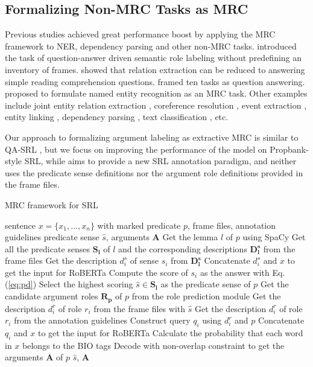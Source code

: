 \documentclass[11pt]{article}
\begin{document}
\subsection{Formalizing Non-MRC Tasks as MRC}
Previous studies achieved great performance boost by applying the MRC framework to NER, dependency parsing and other non-MRC tasks.
\citet{he2015question} introduced the task of question-answer driven semantic role labeling without predefining an inventory of frames. \citet{levy2017zero} showed that relation extraction can be reduced to answering simple reading comprehension questions. \citet{McCann2018TheNL} framed ten tasks as question answering. \citet{Li2020AUM} proposed to
formulate named entity recognition as an MRC task.  Other examples include joint entity relation extraction \cite{Li2019EntityRelationEA}, coreference resolution \cite{Wu2020CorefQACR}, event extraction \cite{Li2020EventEA},  entity linking \cite{Gu2021ReadRS}, dependency parsing \cite{gan2021dependency}, text classification \cite{chai2020description}, etc. 

Our approach to formalizing argument labeling as extractive MRC is similar to QA-SRL \cite{he2015question}, but we focus on improving the performance of the model on Propbank-style SRL, while \citet{he2015question} aims to provide a new SRL annotation paradigm, and \citet{he2015question} neither uses the predicate sense definitions nor the argument role definitions provided in the frame files.

\begin{algorithm}[!ht]
	\caption{MRC framework for SRL}
	\label{alg}
	\begin{algorithmic}[1]
        \REQUIRE sentence $x=\{x_1,...,x_n\}$ with marked predicate $p$, frame files, annotation guidelines
        \ENSURE predicate sense $\hat{s}$, arguments $\bm{A}$
        \STATE Get the lemma $l$ of $p$ using SpaCy
        \STATE Get all the predicate senses $\bm{S_l}$ of $l$ and the corresponding descriptions $\bm{D^s_l}$ from the frame files
            \STATE Get the description $d^s_i$ of sense $s_i$ from $\bm{D^s_l}$
            \STATE Concatenate $d^s_i$ and $x$ to get the input for RoBERTa
            \STATE Compute the score of $s_i$ as the answer with Eq.(\ref{eq:pd})
        \ENDFOR 
        \STATE Select the highest scoring $\hat{s}\in \bm{S_l}$ as the predicate sense of $p$
        \STATE Get the candidate argument roles $\bm{R_p}$ of $p$ from the role prediction module
            \STATE Get the description $d^r_i$ of role $r_i$ from the frame files with $\hat{s}$
            \ELSE
            \STATE Get the description $d^r_i$ of role $r_i$ from the annotation guidelines
            \ENDIF
            \STATE Construct query $q_i$ using $d^r_i$ and $p$
            \STATE Concatenate $q_i$ and $x$ to get the input for RoBERTa
            \STATE Calculate the probability that each word in $x$ belongs to the BIO tags
        \ENDFOR
        \STATE Decode with non-overlap constraint to get the arguments $\bm{A}$ of $p$
        \RETURN $\hat{s}$, $\bm{A}$
	\end{algorithmic}
\end{algorithm}
\end{document}
